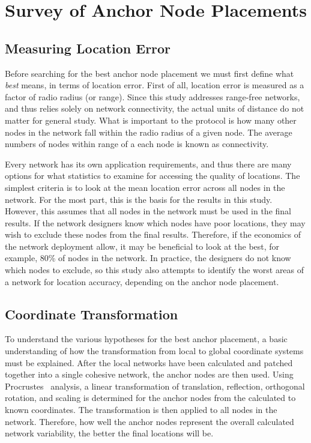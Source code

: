 \chapter{Survey of Anchor Node Placements}

\section{Measuring Location Error}
Before searching for the best anchor node placement we must first define what \emph{best} means, in terms of location error.  First of all, location error is measured as a factor of radio radius (or range).  Since this study addresses range-free networks, and thus relies solely on network connectivity, the actual units of distance do not matter for general study.  What is important to the protocol is how many other nodes in the network fall within the radio radius of a given node.  The average numbers of nodes within range of a each node is known as connectivity.

Every network has its own application requirements, and thus there are many options for what statistics to examine for accessing the quality of locations.  The simplest criteria is to look at the mean location error across all nodes in the network.  For the most part, this is the basis for the results in this study.  However, this assumes that all nodes in the network must be used in the final results.  If the network designers know which nodes have poor locations, they may wish to exclude these nodes from the final results.  Therefore, if the economics of the network deployment allow, it may be beneficial to look at the best, for example, 80\% of nodes in the network.  In practice, the designers do not know which nodes to exclude, so this study also attempts to identify the worst areas of a network for location accuracy, depending on the anchor node placement.  

\section{Coordinate Transformation}
To understand the various hypotheses for the best anchor placement, a basic understanding of how the transformation from local to global coordinate systems must be explained.  After the local networks have been calculated and patched together into a single cohesive network, the anchor nodes are then used. Using Procrustes~\cite{procrustes-matlab} analysis, a linear transformation of translation, reflection, orthogonal rotation, and scaling is determined for the anchor nodes from the calculated to known coordinates. The transformation is then applied to all nodes in the network. Therefore, how well the anchor nodes represent the overall calculated network variability, the better the final locations will be.

